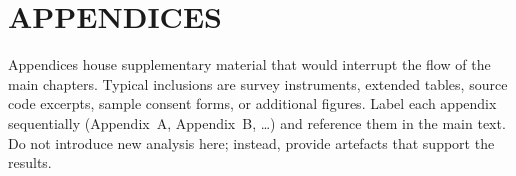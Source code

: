 \section*{APPENDICES}

Appendices house supplementary material that would interrupt the flow of the
main chapters. Typical inclusions are survey instruments, extended tables,
source code excerpts, sample consent forms, or additional figures. Label each
appendix sequentially (Appendix~A, Appendix~B, \dots) and reference them in the
main text. Do not introduce new analysis here; instead, provide artefacts that
support the results.

\clearpage
